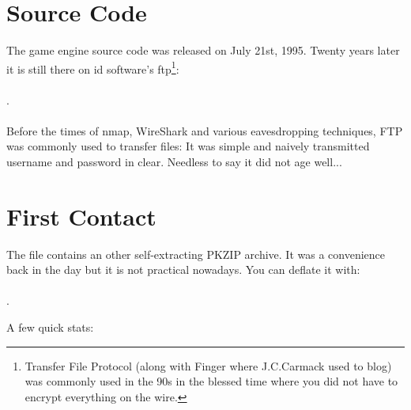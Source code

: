 \documentclass[book.tex]{subfiles}
\begin{document}
\section{Source Code}
The game engine source code was released on July 21st, 1995. Twenty years later it is still there on id software's ftp\footnote{Transfer File Protocol (along with Finger where J.C.Carmack used to blog) was commonly used in the 90s in the blessed time where you did not have to encrypt everything on the wire.}:\\ 
\\.\\
\\
 Before the times of nmap, WireShark and various eavesdropping techniques, FTP was commonly used to transfer files: It was simple and naively transmitted username and password in clear. Needless to say it did not age well...\\

\section{First Contact}
The file  contains an other self-extracting PKZIP archive. It was a convenience back in the day but it is not practical nowadays. You can deflate it with:\\
\\.\\
\par
A few quick stats:\\

\par
\begin{minipage}{\textwidth}

\end{minipage}
\end{document}
